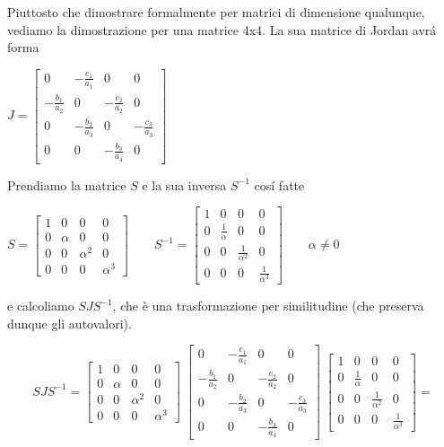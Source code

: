 \begin{thproof}
Piuttosto che dimostrare formalmente per matrici di dimensione qualunque, vediamo la dimostrazione per una matrice 4x4. La sua matrice di Jordan avr\'a forma

$J = \left[ \begin{array}{cccc}
0 & - \frac{c_1}{a_1} & 0 & 0 \\ 
- \frac{b_1}{a_2} & 0 & - \frac{c_2}{a_2} & 0 \\ 
0 & - \frac{b_2}{a_3} & 0 & - \frac{c_3}{a_3} \\ 
0 & 0 & - \frac{b_3}{a_4} & 0
\end{array}  \right]$

Prendiamo la matrice $S$ e la sua inversa $S^{-1}$ cos\'i fatte

$S = \left[ \begin{array}{cccc}
1 & 0 & 0 & 0 \\ 
0 & \alpha & 0 & 0 \\ 
0 & 0 & \alpha^2 & 0 \\ 
0 & 0 & 0 & \alpha^3
\end{array}  \right] \qquad S^{-1} = \left[ \begin{array}{cccc}
1 & 0 & 0 & 0 \\ 
0 & \frac{1}{\alpha} & 0 & 0 \\ 
0 & 0 & \frac{1}{\alpha^2} & 0 \\ 
0 & 0 & 0 & \frac{1}{\alpha^3}
\end{array}  \right] \qquad \alpha \neq 0 $

e calcoliamo $ SJS^{-1} $, che \`e una trasformazione per similitudine (che preserva dunque gli autovalori).

\[SJS^{-1} = \left[ \begin{array}{cccc}
1 & 0 & 0 & 0 \\ 
0 & \alpha & 0 & 0 \\ 
0 & 0 & \alpha^2 & 0 \\ 
0 & 0 & 0 & \alpha^3
\end{array}  \right] \; \left[ \begin{array}{cccc}
0 & - \frac{c_1}{a_1} & 0 & 0 \\ 
- \frac{b_1}{a_2} & 0 & - \frac{c_2}{a_2} & 0 \\ 
0 & - \frac{b_2}{a_3} & 0 & - \frac{c_3}{a_3} \\ 
0 & 0 & - \frac{b_3}{a_4} & 0
\end{array}  \right] \; \left[ \begin{array}{cccc}
1 & 0 & 0 & 0 \\ 
0 & \frac{1}{\alpha} & 0 & 0 \\ 
0 & 0 & \frac{1}{\alpha^2} & 0 \\ 
0 & 0 & 0 & \frac{1}{\alpha^3}
\end{array}  \right] = \]


\end{thproof}
